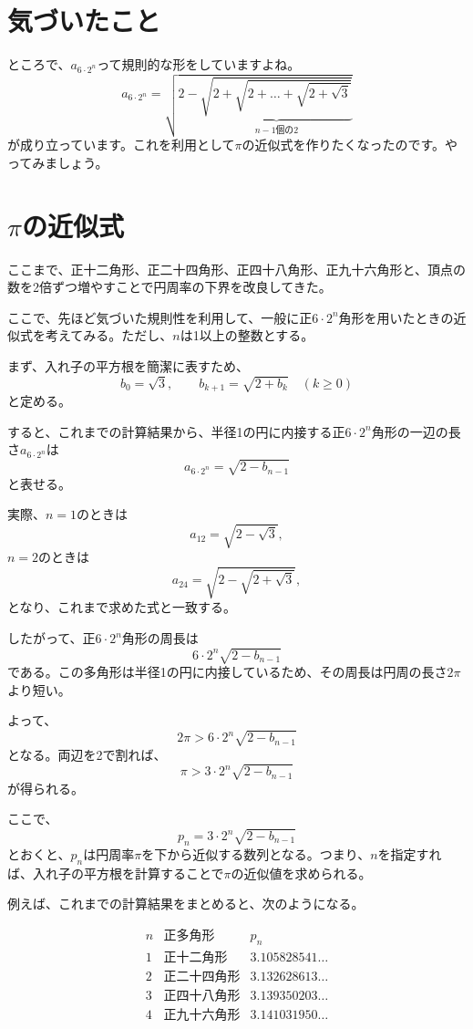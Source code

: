 \documentclass[dvipdfmx]{jlreq}
\begin{document}
\section{気づいたこと}
ところで、$a_{6\cdot2^n}$って規則的な形をしていますよね。
\[
a_{6\cdot2^n}=\sqrt{2-\underbrace{\sqrt{2+\sqrt{2+\dots+\sqrt{2+\sqrt{3}}}}}_{n-1\text{個の}2}}
\]
が成り立っています。これを利用として$\pi$の近似式を作りたくなったのです。やってみましょう。\section{$\pi$の近似式}

ここまで、正十二角形、正二十四角形、正四十八角形、正九十六角形と、頂点の数を2倍ずつ増やすことで円周率の下界を改良してきた。

ここで、先ほど気づいた規則性を利用して、一般に正$6\cdot 2^n$角形を用いたときの近似式を考えてみる。ただし、$n$は1以上の整数とする。

まず、入れ子の平方根を簡潔に表すため、
\[
b_0=\sqrt{3},\qquad
b_{k+1}=\sqrt{2+b_k}\quad(k\geq 0)
\]
と定める。

すると、これまでの計算結果から、半径1の円に内接する正$6\cdot 2^n$角形の一辺の長さ$a_{6\cdot 2^n}$は
\[ a_{6\cdot 2^n}=\sqrt{2-b_{n-1}} \]
と表せる。

実際、$n=1$のときは
\[ a_{12}=\sqrt{2-\sqrt{3}}, \]
$n=2$のときは
\[ a_{24}=\sqrt{2-\sqrt{2+\sqrt{3}}}, \]
となり、これまで求めた式と一致する。

したがって、正$6\cdot 2^n$角形の周長は
\[ 6\cdot 2^n\sqrt{2-b_{n-1}} \]
である。この多角形は半径1の円に内接しているため、その周長は円周の長さ$2\pi$より短い。

よって、
\[ 2\pi>6\cdot 2^n\sqrt{2-b_{n-1}} \]
となる。両辺を2で割れば、
\[
\boxed{\pi>3\cdot 2^n\sqrt{2-b_{n-1}}}
\]
が得られる。

ここで、
\[
\boxed{p_n=3\cdot 2^n\sqrt{2-b_{n-1}}}
\]
とおくと、$p_n$は円周率$\pi$を下から近似する数列となる。つまり、$n$を指定すれば、入れ子の平方根を計算することで$\pi$の近似値を求められる。

例えば、これまでの計算結果をまとめると、次のようになる。

\[
\begin{array}{c|c|c}
n & \text{正多角形} & p_n\\ \hline
1 & \text{正十二角形} & 3.105828541\ldots\\
2 & \text{正二十四角形} & 3.132628613\ldots\\
3 & \text{正四十八角形} & 3.139350203\ldots\\
4 & \text{正九十六角形} & 3.141031950\ldots
\end{array}
\]
\end{document}
